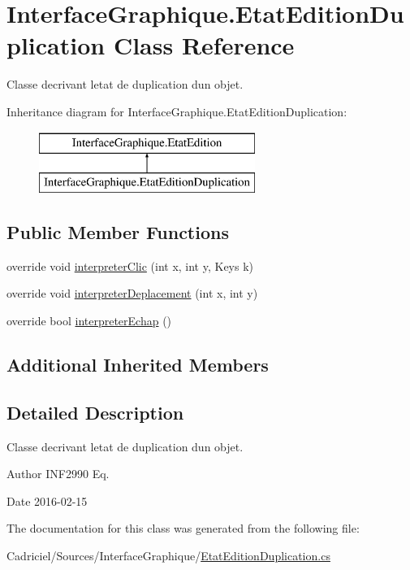 \hypertarget{class_interface_graphique_1_1_etat_edition_duplication}{}\section{Interface\+Graphique.\+Etat\+Edition\+Duplication Class Reference}
\label{class_interface_graphique_1_1_etat_edition_duplication}


Classe decrivant l\textquotesingle{}etat de duplication d\textquotesingle{}un objet.  


Inheritance diagram for Interface\+Graphique.\+Etat\+Edition\+Duplication\+:\begin{figure}[H]
\begin{center}
\leavevmode
\includegraphics[height=2.000000cm]{class_interface_graphique_1_1_etat_edition_duplication}
\end{center}
\end{figure}
\subsection*{Public Member Functions}
\begin{DoxyCompactItemize}
\item 
override void \hyperlink{group__inf2990_ga798fb4efadd7939ccf925d0aafb70492}{interpreter\+Clic} (int x, int y, Keys k)
\item 
override void \hyperlink{group__inf2990_gab2a60a3e707358497925df99b483cae0}{interpreter\+Deplacement} (int x, int y)
\item 
override bool \hyperlink{group__inf2990_gad2a0ed82508e947c24ffe99b78280b63}{interpreter\+Echap} ()
\end{DoxyCompactItemize}
\subsection*{Additional Inherited Members}


\subsection{Detailed Description}
Classe decrivant l\textquotesingle{}etat de duplication d\textquotesingle{}un objet. 

\begin{DoxyAuthor}{Author}
I\+N\+F2990 Eq. 
\end{DoxyAuthor}
\begin{DoxyDate}{Date}
2016-\/02-\/15 
\end{DoxyDate}


The documentation for this class was generated from the following file\+:\begin{DoxyCompactItemize}
\item 
Cadriciel/\+Sources/\+Interface\+Graphique/\hyperlink{_etat_edition_duplication_8cs}{Etat\+Edition\+Duplication.\+cs}\end{DoxyCompactItemize}
